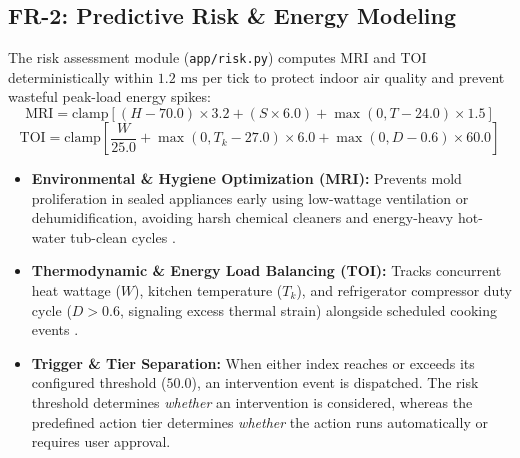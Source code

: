 \documentclass[conference]{IEEEtran}
\begin{document}
\subsection{FR-2: Predictive Risk \& Energy Modeling}
The risk assessment module (\texttt{app/risk.py}) computes MRI and TOI deterministically within $1.2\text{ ms}$ per tick to protect indoor air quality and prevent wasteful peak-load energy spikes:
\begin{equation}
\text{MRI} = \text{clamp}\left[(H - 70.0) \times 3.2 + (S \times 6.0) + \max(0, T - 24.0) \times 1.5\right]
\end{equation}
\begin{equation}
\text{TOI} = \text{clamp}\left[\frac{W}{25.0} + \max(0, T_k - 27.0) \times 6.0 + \max(0, D - 0.6) \times 60.0\right]
\end{equation}
\begin{itemize}
    \item \textbf{Environmental \& Hygiene Optimization (MRI):} Prevents mold proliferation in sealed appliances early using low-wattage ventilation or dehumidification, avoiding harsh chemical cleaners and energy-heavy hot-water tub-clean cycles \cite{epa2022, who2009}.
    \item \textbf{Thermodynamic \& Energy Load Balancing (TOI):} Tracks concurrent heat wattage ($W$), kitchen temperature ($T_k$), and refrigerator compressor duty cycle ($D > 0.6$, signaling excess thermal strain) alongside scheduled cooking events \cite{ashrae2023}.
    \item \textbf{Trigger \& Tier Separation:} When either index reaches or exceeds its configured threshold ($50.0$), an intervention event is dispatched. The risk threshold determines \emph{whether} an intervention is considered, whereas the predefined action tier determines \emph{whether} the action runs automatically or requires user approval.
\end{itemize}
\end{document}
